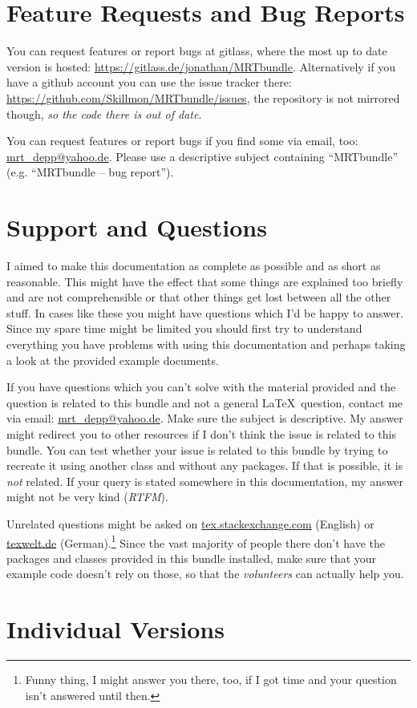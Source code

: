 \section{Feature Requests and Bug Reports}\label{sec:bugs}
You can request features or report bugs at gitlass, where the most up to date
version is hosted:
\url{https://gitlass.de/jonathan/MRTbundle}. Alternatively if you have a github
account you can use the issue tracker there:
\url{https://github.com/Skillmon/MRTbundle/issues}, the repository is not
mirrored though, \emph{so the code there is out of date}.

You can request features or report bugs if you find some via
email, too:
\href{mailto:mrt_depp@yahoo.de?subject=MRTbundle -- bug report}
  {mrt\_depp@yahoo.de}.
Please use a descriptive subject containing ``MRTbundle'' (e.g. ``MRTbundle --
bug report'').

\section{Support and Questions}
I aimed to make this documentation as complete as possible and as short as
reasonable. This might have the effect that some things are explained too
briefly and are not comprehensible or that other things get lost between all the
other stuff. In cases like these you might have questions which I'd be happy to
answer. Since my spare time might be limited you should first try to understand
everything you have problems with using this documentation and perhaps taking a
look at the provided example documents.

If you have questions which you can't solve with the material provided and the
question is related to this bundle and not a general \LaTeX\ question, contact
me via email:
\href{mailto:mrt_depp@yahoo.de?subject=MRTbundle -- support}
  {mrt\_depp@yahoo.de}.
Make sure the subject is descriptive. My answer might redirect you to other
resources if I don't think the issue is related to this bundle. You can test
whether your issue is related to this bundle by trying to recreate it using
another class and without any  packages. If that is possible, it is
\emph{not} related. If your query is stated somewhere in this documentation, my
answer might not be very kind (\!\emph{RTFM}).

Unrelated questions might be asked on \url{tex.stackexchange.com} (English) or
\url{texwelt.de} (German).\footnote{Funny thing, I might answer you there, too,
if I got time and your question isn't answered until then.} Since the vast
majority of people there don't have the packages and classes provided in this
bundle installed, make sure that your example code doesn't rely on those, so
that the \emph{volunteers} can actually help you.

\section{Individual Versions}
\docIndividualVersions
